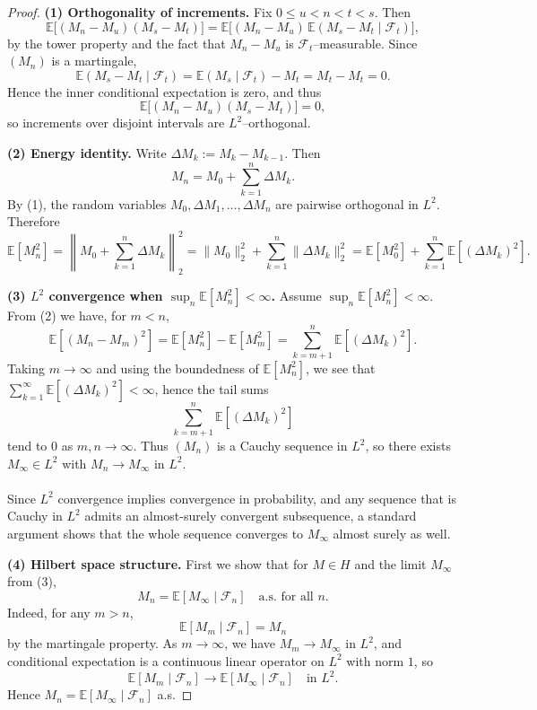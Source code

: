 \documentclass[11pt,a4paper]{article}
\theoremstyle{definition}
\begin{document}
\begin{proof}
\textbf{(1) Orthogonality of increments.}
Fix $0\le u < n < t < s$. Then
\[
\mathbb{E}\big[(M_n - M_u)(M_s - M_t)\big]
    = \mathbb{E}\big[ (M_n - M_u)\,
       \mathbb{E}(M_s - M_t \mid \mathcal{F}_t) \big],
\]
by the tower property and the fact that $M_n - M_u$ is
$\mathcal{F}_t$–measurable.
Since $(M_n)$ is a martingale,
\[
\mathbb{E}(M_s - M_t \mid \mathcal{F}_t)
    = \mathbb{E}(M_s \mid \mathcal{F}_t) - M_t = M_t - M_t = 0.
\]
Hence the inner conditional expectation is zero, and thus
\[
\mathbb{E}\big[(M_n - M_u)(M_s - M_t)\big] = 0,
\]
so increments over disjoint intervals are $L^2$–orthogonal.

\medskip

\textbf{(2) Energy identity.}
Write $\Delta M_k := M_k - M_{k-1}$. Then
\[
M_n = M_0 + \sum_{k=1}^n \Delta M_k.
\]
By (1), the random variables $M_0,\Delta M_1,\dots,\Delta M_n$ are
pairwise orthogonal in $L^2$. Therefore
\[
\mathbb{E}[M_n^2]
 = \left\| M_0 + \sum_{k=1}^n \Delta M_k \right\|_2^2
 = \|M_0\|_2^2 + \sum_{k=1}^n \|\Delta M_k\|_2^2
 = \mathbb{E}[M_0^2] + \sum_{k=1}^n \mathbb{E}[(\Delta M_k)^2].
\]

\medskip

\textbf{(3) $L^2$ convergence when $\sup_n \mathbb{E}[M_n^2]<\infty$.}
Assume $\sup_n \mathbb{E}[M_n^2] < \infty$.
From (2) we have, for $m<n$,
\[
\mathbb{E}[(M_n - M_m)^2]
  = \mathbb{E}[M_n^2] - \mathbb{E}[M_m^2]
  = \sum_{k=m+1}^n \mathbb{E}[(\Delta M_k)^2].
\]
Taking $m\to\infty$ and using the boundedness of $\mathbb{E}[M_n^2]$,
we see that $\sum_{k=1}^\infty \mathbb{E}[(\Delta M_k)^2] < \infty$, hence
the tail sums
\[
\sum_{k=m+1}^n \mathbb{E}[(\Delta M_k)^2]
\]
tend to $0$ as $m,n\to\infty$. Thus $(M_n)$ is a Cauchy sequence in $L^2$,
so there exists $M_\infty \in L^2$ with $M_n \to M_\infty$ in $L^2$.
~\\~\\
Since $L^2$ convergence implies convergence in probability, and any
sequence that is Cauchy in $L^2$ admits an almost-surely convergent
subsequence, a standard argument shows that the whole sequence converges
to $M_\infty$ almost surely as well.

\medskip

\textbf{(4) Hilbert space structure.}
First we show that for $M\in H$ and the limit $M_\infty$ from (3),
\[
M_n = \mathbb{E}[M_\infty \mid \mathcal{F}_n] \quad \text{a.s. for all } n.
\]
Indeed, for any $m>n$,
\[
\mathbb{E}[M_m \mid \mathcal{F}_n] = M_n
\]
by the martingale property. As $m\to\infty$, we have
$M_m \to M_\infty$ in $L^2$, and conditional expectation is a
continuous linear operator on $L^2$ with norm $1$, so
\[
\mathbb{E}[M_m \mid \mathcal{F}_n] \to \mathbb{E}[M_\infty \mid \mathcal{F}_n]
\quad \text{in } L^2.
\]
Hence $M_n = \mathbb{E}[M_\infty \mid \mathcal{F}_n]$ a.s.


\end{proof}
\end{document}
